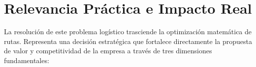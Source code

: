 



\section{Relevancia Práctica e Impacto Real}

La resolución de este problema logístico trasciende la optimización matemática de rutas. Representa una decisión estratégica que fortalece directamente la propuesta de valor y competitividad de la empresa a través de tres dimensiones fundamentales:




